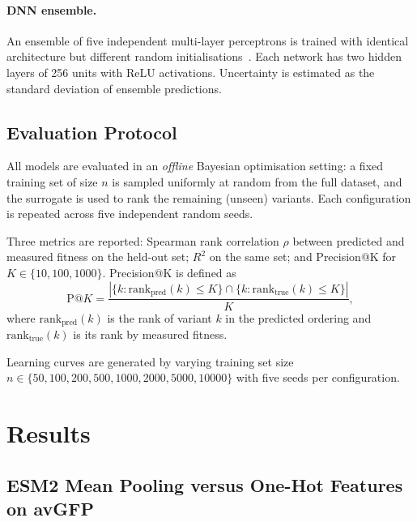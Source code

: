 \documentclass[english, 12pt, a4paper, elec, utf8, a-2b, online]{aaltothesis}
\begin{document}
\paragraph{DNN ensemble.}
An ensemble of five independent multi-layer perceptrons is trained with identical architecture
but different random initialisations~\cite{Lakshminarayanan2017}.
Each network has two hidden layers of 256 units with ReLU activations.
Uncertainty is estimated as the standard deviation of ensemble predictions.

\subsection{Evaluation Protocol}
\label{sec:methods:eval}

All models are evaluated in an \emph{offline} Bayesian optimisation setting:
a fixed training set of size $n$ is sampled uniformly at random from the full dataset,
and the surrogate is used to rank the remaining (unseen) variants.
Each configuration is repeated across five independent random seeds.

Three metrics are reported: Spearman rank correlation $\rho$ between predicted and
measured fitness on the held-out set; $R^2$ on the same set; and Precision@K for
$K \in \{10, 100, 1000\}$.
Precision@K is defined as
\begin{equation}
  \text{P@}K = \frac{|\{k : \text{rank}_\text{pred}(k) \leq K\} \cap \{k : \text{rank}_\text{true}(k) \leq K\}|}{K},
\end{equation}
where $\text{rank}_\text{pred}(k)$ is the rank of variant $k$ in the predicted ordering and
$\text{rank}_\text{true}(k)$ is its rank by measured fitness.

Learning curves are generated by varying training set size
$n \in \{50, 100, 200, 500, 1000, 2000, 5000, 10000\}$ with five seeds per configuration.

\clearpage

\section{Results}
\label{sec:results}
\thispagestyle{empty}

\subsection{ESM2 Mean Pooling versus One-Hot Features on avGFP}
\label{sec:results:esm2-onehot}
\end{document}
